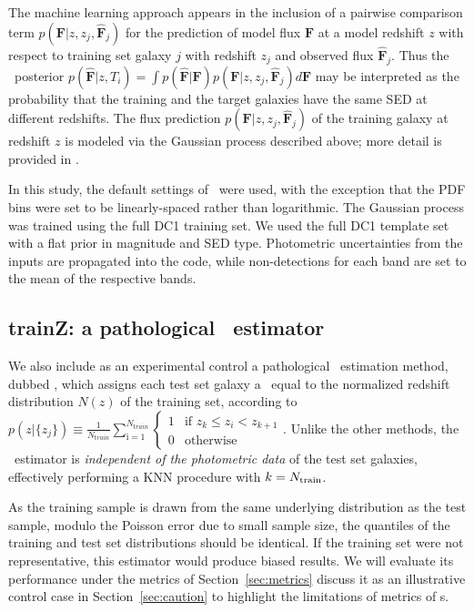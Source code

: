 The machine learning approach appears in the inclusion of a pairwise comparison term $p(\mathbf{F} \vert z, z_j, \mathbf{\hat{F}}_j)$ for the prediction of model flux $\mathbf{F}$ at a model redshift $z$ with respect to training set galaxy $j$ with redshift $z_j$ and observed flux $\mathbf{\hat{F}}_j$.
Thus the \pz\ posterior $p(\mathbf{\hat{F}} \vert z, T_i) = \int p(\mathbf{\hat{F}} \vert \mathbf{F}) p(\mathbf{F} \vert z, z_j, \mathbf{\hat{F}}_j) d\mathbf{F}$ may be interpreted as the probability that the training and the target galaxies have the same SED at different redshifts.
The flux prediction $p(\mathbf{F} \vert z, z_j, \mathbf{\hat{F}}_j)$ of the training galaxy at redshift $z$ is modeled via the Gaussian process described above; more detail is provided in \citet{Leistedt:17}.

In this study, the default settings of \delight\ were used, with the exception that the PDF bins were set to be linearly-spaced rather than logarithmic.
The Gaussian process was trained using the full DC1 training set.
We used the full DC1 template set with a flat prior in magnitude and SED type.
Photometric uncertainties from the inputs are propagated into the code, while non-detections for each band are set to the mean of the respective bands.

\subsection{trainZ: a pathological \pz\ estimator}
\label{sec:method:trainz}

We also include as an experimental control a pathological \pzpdf\ estimation method, dubbed \trainz, which assigns each test set galaxy a \pzpdf\ equal to the normalized redshift distribution $N(z)$ of the training set, according to $p(z \vert \{z_{j}\}) \equiv \frac{1}{N_{ \mathrm train}}\sum_{\mathrm i=1}^{N_{\mathrm train}} \begin{cases} 1 & \text{if\ } z_{k}\leq z_{i} < z_{k+1}\\ 0 & \text{otherwise} \end{cases}$.
Unlike the other methods, the \trainz\ estimator is \textit{independent of the photometric data} of the test set galaxies, effectively performing a KNN procedure with $k=N_{\rm train}$.

As the training sample is drawn from the same underlying distribution as the test sample, modulo the Poisson error due to small sample size, the quantiles of the training and test set distributions should be identical.
If the training set were not representative, this estimator would produce biased results.
We will evaluate its performance under the metrics of Section~\ref{sec:metrics} discuss it as an illustrative control case in Section~\ref{sec:caution} to highlight the limitations of metrics of \pzpdf s.
